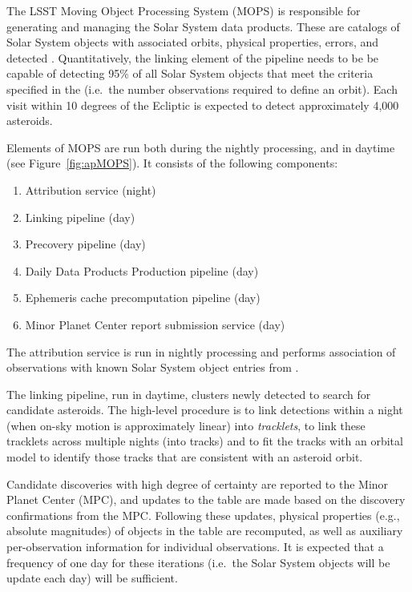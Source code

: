 The LSST Moving Object Processing System (MOPS) is responsible for generating and managing the Solar System data products. These are catalogs of Solar System objects with associated orbits, physical properties, errors, and detected \DIASources. Quantitatively, the linking element of the pipeline needs to be be capable of detecting 95\%  of all Solar System objects that meet the criteria specified in the \OSS\@ {} (i.e.\ the number observations required to define an orbit). Each visit within 10 degrees of the Ecliptic is expected to detect approximately 4,000 asteroids.

Elements of MOPS are run both during the nightly processing, and in daytime (see Figure~\ref{fig:apMOPS}). It consists of the following components:
%
\begin{enumerate}
	\item Attribution service (night)
	\item Linking pipeline (day)
	\item Precovery pipeline (day)
	\item Daily Data Products Production pipeline (day)
	\item Ephemeris cache precomputation pipeline (day)
	\item Minor Planet Center report submission service (day)
\end{enumerate}
%
The attribution service is run in nightly processing and performs association of observations with known Solar System object entries from \MPCORB.

The linking pipeline, run in daytime, clusters newly detected \DIAObjects to search for candidate asteroids. The high-level procedure is to link \DIASource detections within a night (when on-sky motion is approximately linear) into {\em tracklets}, to link these tracklets across multiple nights (into tracks) and to fit the tracks with an orbital model to identify those tracks that are consistent with an asteroid orbit.

Candidate discoveries with high degree of certainty are reported to the Minor Planet Center (MPC), and updates to the \MPCORB table are made based on the discovery confirmations from the MPC. Following these updates, physical properties (e.g., absolute magnitudes) of objects in the \SSObject table are recomputed, as well as auxiliary per-observation information for individual observations. It is expected that a frequency of one day for these iterations (i.e.\ the Solar System objects will be update each day) will be sufficient.

